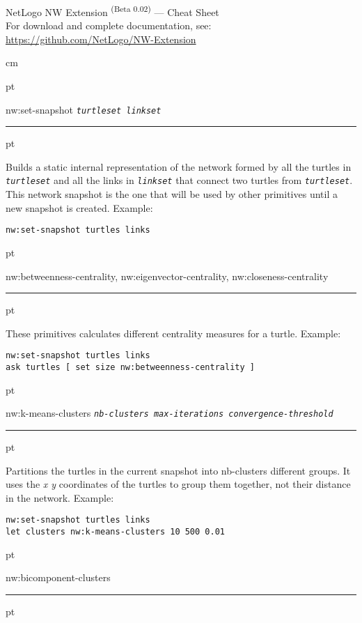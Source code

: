 \documentclass[12pt]{article}
\newenvironment{prim}{
  \leftskip 0cm
  \vskip 6 pt
  \ttfamily
  \bfseries
}{
  \hrule
  \vskip 6 pt
}
\newcommand{\param}[1]{\texttt{\textit{\textmd{#1}}}}
\begin{document}
{
  \begin{center}
  \Huge NetLogo NW Extension \textsuperscript{\small(Beta 0.02)} — Cheat Sheet
  \\
  \normalsize For download and complete documentation, see: \\
  \url{https://github.com/NetLogo/NW-Extension}
  \end{center}
  \vspace{1 em}
}

 cm

\begin{prim}
nw:set-snapshot \param{turtleset linkset}
\end{prim}

Builds a static internal representation of the network formed by all the turtles
in \param{turtleset} and all the links in \param{linkset} that connect two
turtles from \param{turtleset}. This network snapshot is the one that will be used by
other primitives until a new snapshot is created. Example:
\begin{Verbatim}
nw:set-snapshot turtles links
\end{Verbatim}


\begin{prim}
nw:betweenness-centrality,
nw:eigenvector-centrality,
nw:closeness-centrality
\end{prim}

These primitives calculates different centrality measures for a turtle. Example:
\begin{Verbatim}
nw:set-snapshot turtles links
ask turtles [ set size nw:betweenness-centrality ]
\end{Verbatim}

\begin{prim}
nw:k-means-clusters \param{nb-clusters max-iterations
convergence-threshold}
\end{prim}

Partitions the turtles in the current snapshot into nb-clusters different
groups. It uses the \emph{x y} coordinates of the turtles to group them together, not
their distance in the network. Example:

\begin{Verbatim}
nw:set-snapshot turtles links
let clusters nw:k-means-clusters 10 500 0.01
\end{Verbatim}

\begin{prim}
nw:bicomponent-clusters
\end{prim}
\end{document}
